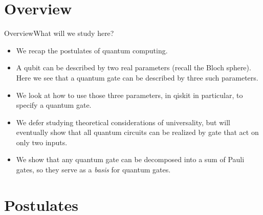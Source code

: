 
\section*{Overview}
\begin{frame}{Overview}{What will we study here?}
\begin{itemize}
    \item We recap the postulates of quantum computing.
    \item A qubit can be described by two real parameters (recall the Bloch sphere).  Here we see that a quantum gate can be described by three such parameters.
    \item We look at how to use those three parameters, in qiskit in particular, to specify a quantum gate.
    \item We defer studying theoretical considerations of universality, but will eventually show that all quantum circuits can be realized by gate that act on only two inputs.
    \item We show that any quantum gate can be decomposed into a sum of Pauli gates, so they serve as a \emph{basis} for quantum gates.
\end{itemize}
\end{frame}

\section*{Postulates}

